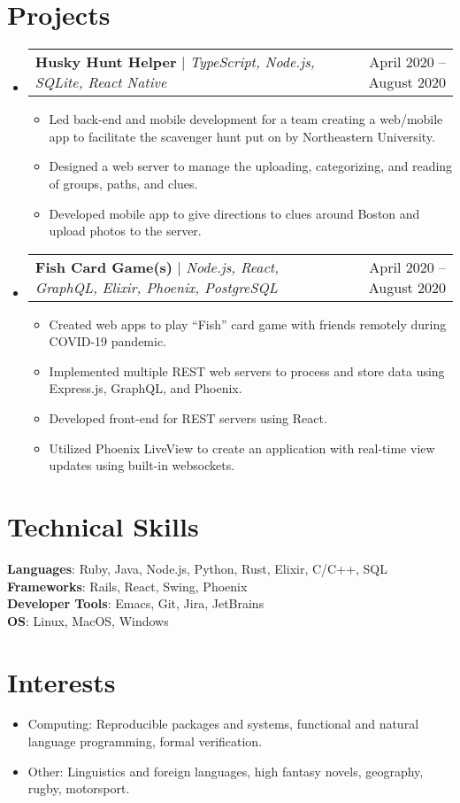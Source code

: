 \documentclass[letterpaper,11pt]{article}
\makeatletter
\newcommand{\resumeItem}[1]{
	\item\small{
		{#1 \vspace{-2pt}}
	}
}
\newcommand{\resumeProjectHeading}[3]{
	\item
    \begin{tabular*}{0.97\textwidth}{l@{\extracolsep{\fill}}r}
      {\textbf{#1} $|$ \emph{#2}} & #3 \\
	\end{tabular*}\vspace{-7pt}
}
\newcommand{\resumeSubHeadingListStart}{
  \begin{itemize}[leftmargin=0.15in, label={}]
}
\newcommand{\resumeSubHeadingListEnd}{
\end{itemize}
}
\newcommand{\resumeItemListStart}{
  \begin{itemize}
}
\newcommand{\resumeItemListEnd}{
\end{itemize}\vspace{-5pt}
}
\makeatother
\begin{document}
\section{Projects}
\resumeSubHeadingListStart
\resumeProjectHeading
{\textbf{Husky Hunt Helper}} {TypeScript, Node.js, SQLite, React Native} {April 2020 -- August 2020}
\resumeItemListStart
\resumeItem{Led back-end and mobile development for a team creating a web/mobile app to facilitate the scavenger hunt put on by Northeastern University.}
\resumeItem{Designed a web server to manage the uploading, categorizing, and reading of groups, paths, and clues.}
\resumeItem{Developed mobile app to give directions to clues around Boston and upload photos to the server.}
\resumeItemListEnd
\resumeProjectHeading
{\textbf{Fish Card Game(s)}} {Node.js, React, GraphQL, Elixir, Phoenix, PostgreSQL} {April 2020 -- August 2020}
\resumeItemListStart
\resumeItem{Created web apps to play ``Fish'' card game with friends remotely during COVID-19 pandemic.}
\resumeItem{Implemented multiple REST web servers to process and store data using Express.js, GraphQL, and Phoenix.}
\resumeItem{Developed front-end for REST servers using React.}
\resumeItem{Utilized Phoenix LiveView to create an application with real-time view updates using built-in websockets.}
\resumeItemListEnd
\resumeSubHeadingListEnd

\section{Technical Skills}
\begin{itemize}[leftmargin=0.15in, label={}]
	\small{\item{
	      \textbf{Languages}{: Ruby, Java, Node.js, Python, Rust, Elixir, C/C++, SQL} \\
	      \textbf{Frameworks}{: Rails, React, Swing, Phoenix} \\
	      \textbf{Developer Tools}{: Emacs, Git, Jira, JetBrains}\\
	      \textbf{OS}{: Linux, MacOS, Windows}
	      }}
    \end{itemize}

\section{Interests}
\resumeItemListStart
\resumeItem{Computing: Reproducible packages and systems, functional and natural language programming, formal verification.}
\resumeItem{Other: Linguistics and foreign languages, high fantasy novels, geography, rugby, motorsport.}
\resumeItemListEnd

\end{document}
